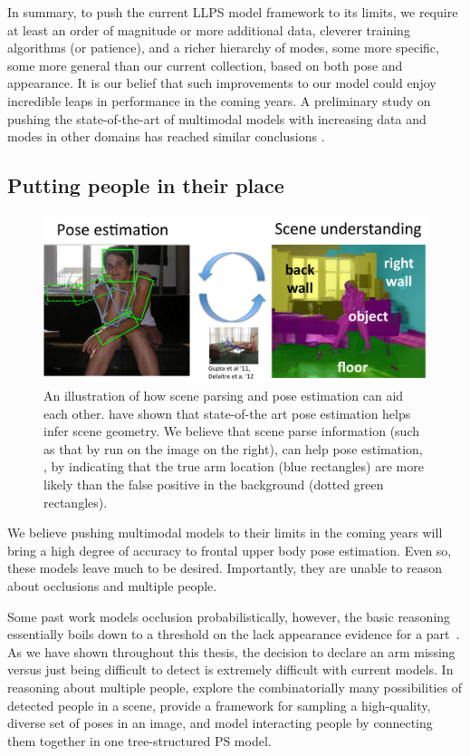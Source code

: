 In summary, to push the current LLPS model framework to its limits, we require 
at least an order of magnitude or more additional data, cleverer training 
algorithms (or patience), and a richer hierarchy of modes, some more specific, 
some more general than our current collection, based on both pose and 
appearance.  It is our belief that such improvements to our model could enjoy 
incredible leaps in performance in the coming years.   A preliminary study on 
pushing the state-of-the-art of multimodal models with increasing data and 
modes in other domains has reached similar conclusions \citep{zhuwe}.

\subsection{Putting people in their place}

\begin{figure}[tb!]
\centering
\includegraphics[width=0.80\linewidth]{figs/pose+scene.pdf}
\caption[Joint pose and scene reasoning.]{
\label{fig:pose-scene} {An illustration of how scene parsing and pose 
estimation can aid each other. \citet{gupta11,delaitre12} have shown that 
state-of-the art pose estimation helps infer scene geometry.  We believe that 
scene parse information (such as that by \citet{lee09} run on the image on the 
right), can help pose estimation, \eg, by indicating that the true arm location 
(blue rectangles) are more likely than the false positive in the background 
(dotted green rectangles). }}
\end{figure}


We believe pushing multimodal models to their limits in the coming years will 
bring a high degree of accuracy to frontal upper body pose estimation.  Even 
so, these models leave much to be desired.  Importantly, they are unable to 
reason about occlusions and multiple people. 

Some past work models occlusion probabilistically, however, the basic reasoning 
essentially boils down to a threshold on the lack appearance evidence for a 
part~\citep{wang2008multiple}.  As we have shown throughout this thesis, the 
decision to declare an arm missing versus just being difficult to detect is 
extremely difficult with current models.  In reasoning about multiple people, 
\citet{eichner2010we} explore the combinatorially many possibilities of 
detected people in a scene, \citet{kulesza11} provide a framework for sampling 
a high-quality, diverse set of poses in an image, and 
\citet{andriluka-multiple} model interacting people by connecting them together 
in one tree-structured PS model.

